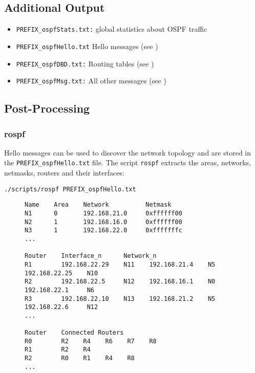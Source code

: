 \documentclass[documentation]{subfiles}
\begin{document}
\subsection{Additional Output}
\begin{itemize}
    \item {\tt PREFIX\_ospfStats.txt:} global statistics about OSPF traffic
    \item {\tt PREFIX\_ospfHello.txt} Hello messages (see )
    \item {\tt PREFIX\_ospfDBD.txt:} Routing tables (see )
    \item {\tt PREFIX\_ospfMsg.txt:} All other messages (see )
\end{itemize}

\subsection{Post-Processing}\label{s:ospf-pp}

\subsubsection{rospf}
Hello messages can be used to discover the network topology and are stored in the {\tt PREFIX\_ospfHello.txt} file. The script {\tt rospf} extracts the areas, networks, netmasks, routers and their interfaces:
\begin{center}
    {\tt ./scripts/rospf PREFIX\_ospfHello.txt}
\end{center}

\begin{figure}[!ht]
\centering
\begin{lstlisting}
Name    Area    Network          Netmask
N1      0       192.168.21.0     0xffffff00
N2      1       192.168.16.0     0xffffff00
N3      1       192.168.22.0     0xfffffffc
...

Router    Interface_n      Network_n
R1        192.168.22.29    N11    192.168.21.4    N5    192.168.22.25    N10
R2        192.168.22.5     N12    192.168.16.1    N0    192.168.22.1     N6
R3        192.168.22.10    N13    192.168.21.2    N5    192.168.22.6     N12
...

Router    Connected Routers
R0        R2    R4    R6    R7    R8
R1        R2    R4
R2        R0    R1    R4    R8
...
\end{lstlisting}
\end{figure}
\end{document}

